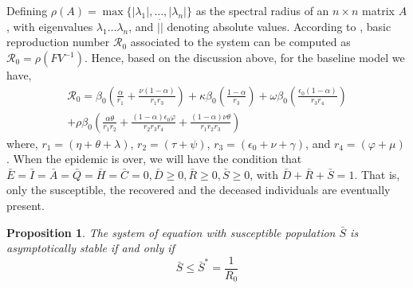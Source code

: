 \documentclass[authoryear,preprint]{elsarticle}
\newtheorem{proposition}{Proposition}
\begin{document}
%
%
Defining $\rho(A) = \max {\{ | \lambda_1 |, \ldots,  | \lambda_n |\} }$ as the spectral radius of an $n \times n$ matrix $A$, with eigenvalues $\lambda_1 \ldots \lambda_n$, and $|\dot|$ denoting absolute values. According to \cite{VANDENDRIESSCHE200229}, basic reproduction number $\mathcal{R}_0$ associated to the system can be computed as $\mathcal{R}_0 = \rho(FV^{-1})$. Hence, based on the discussion above, for the baseline model we have,
%
%
\begin{equation}
\begin{split}
\mathcal{R}_0 =  \beta_0 \left( \frac{\alpha}{r_1} + \frac{\nu \left(1-\alpha \right) }{r_1 r_3}\right) + \kappa \beta_0 \left( \frac{1-\alpha}{r_3} \right) + \omega \beta_0 \left( \frac{\epsilon_0 \left( 1-\alpha\right) }{r_3 r_4}\right) \\
+ \rho \beta_0 \left( \frac{\alpha \theta}{r_1 r_2} + \frac{\left( 1-\alpha\right) \epsilon_0 \varphi}{r_2 r_3 r_4} + \frac{\left( 1-\alpha\right) \nu \theta}{r_1 r_2 r_3}\right) 
\end{split}
\label{eqn:Rnot}
\end{equation}
%
%
where, $r_1 = \left( \eta + \theta + \lambda \right) $, $r_2 = \left( \tau + \psi \right) $, $r_3 = \left( \epsilon_0 + \nu + \gamma\right) $, and $r_4 =  \left( \varphi + \mu\right)$.
%
%
When the epidemic is over, we will have the condition that $\bar{E}=\bar{I}=\bar{A}=\bar{Q}=\bar{H}=\bar{C}=0,  \bar{D}\geq 0, \bar{R}\geq 0, \bar{S}\geq 0$, with $\bar{D} + \bar{R} + \bar{S} = 1$. That is, only the susceptible, the recovered and the deceased individuals are eventually present.
%
%
\begin{proposition}
The system of equation with susceptible population $\bar{S}$ is asymptotically stable if and only if
\begin{equation}
\bar{S} \leq \bar{S}^* = \frac{1}{R_0}
\end{equation}
\end{proposition}
\end{document}
